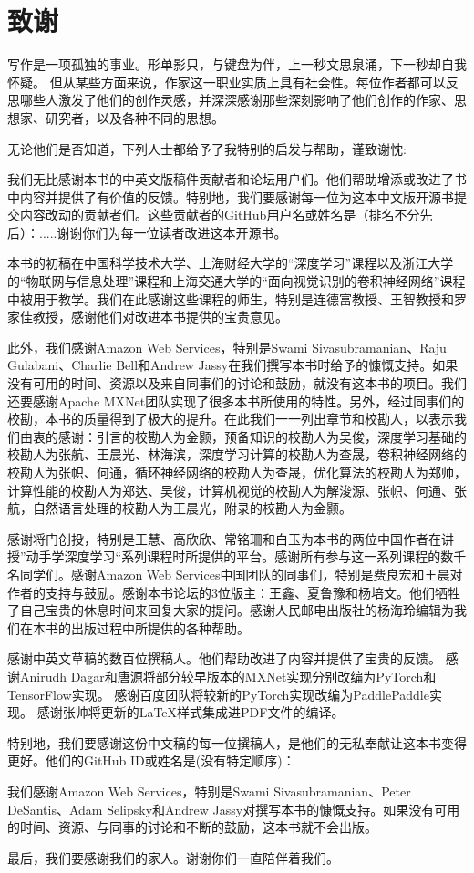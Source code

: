 \chapter*{ 致谢}

写作是一项孤独的事业。形单影只，与键盘为伴，上一秒文思泉涌，下一秒却自我怀疑。
但从某些方面来说，作家这一职业实质上具有社会性。每位作者都可以反思哪些人激发了他们的创作灵感，并深深感谢那些深刻影响了他们创作的作家、思想家、研究者，以及各种不同的思想。

无论他们是否知道，下列人士都给予了我特别的启发与帮助，谨致谢忱:

我们无比感谢本书的中英文版稿件贡献者和论坛用户们。他们帮助增添或改进了书中内容并提供了有价值的反馈。特别地，我们要感谢每一位为这本中文版开源书提交内容改动的贡献者们。这些贡献者的GitHub用户名或姓名是（排名不分先后）：.....谢谢你们为每一位读者改进这本开源书。

本书的初稿在中国科学技术大学、上海财经大学的“深度学习”课程以及浙江大学的“物联网与信息处理”课程和上海交通大学的“面向视觉识别的卷积神经网络”课程中被用于教学。我们在此感谢这些课程的师生，特别是连德富教授、王智教授和罗家佳教授，感谢他们对改进本书提供的宝贵意见。

此外，我们感谢Amazon Web Services，特别是Swami Sivasubramanian、Raju Gulabani、Charlie Bell和Andrew Jassy在我们撰写本书时给予的慷慨支持。如果没有可用的时间、资源以及来自同事们的讨论和鼓励，就没有这本书的项目。我们还要感谢Apache MXNet团队实现了很多本书所使用的特性。另外，经过同事们的校勘，本书的质量得到了极大的提升。在此我们一一列出章节和校勘人，以表示我们由衷的感谢：引言的校勘人为金颢，预备知识的校勘人为吴俊，深度学习基础的校勘人为张航、王晨光、林海滨，深度学习计算的校勘人为查晟，卷积神经网络的校勘人为张帜、何通，循环神经网络的校勘人为查晟，优化算法的校勘人为郑帅，计算性能的校勘人为郑达、吴俊，计算机视觉的校勘人为解浚源、张帜、何通、张航，自然语言处理的校勘人为王晨光，附录的校勘人为金颢。

感谢将门创投，特别是王慧、高欣欣、常铭珊和白玉为本书的两位中国作者在讲授”动手学深度学习“系列课程时所提供的平台。感谢所有参与这一系列课程的数千名同学们。感谢Amazon Web Services中国团队的同事们，特别是费良宏和王晨对作者的支持与鼓励。感谢本书论坛的3位版主：王鑫、夏鲁豫和杨培文。他们牺牲了自己宝贵的休息时间来回复大家的提问。感谢人民邮电出版社的杨海玲编辑为我们在本书的出版过程中所提供的各种帮助。


感谢中英文草稿的数百位撰稿人。他们帮助改进了内容并提供了宝贵的反馈。 感谢Anirudh Dagar和唐源将部分较早版本的MXNet实现分别改编为PyTorch和TensorFlow实现。 感谢百度团队将较新的PyTorch实现改编为PaddlePaddle实现。 感谢张帅将更新的LaTeX样式集成进PDF文件的编译。

特别地，我们要感谢这份中文稿的每一位撰稿人，是他们的无私奉献让这本书变得更好。他们的GitHub ID或姓名是(没有特定顺序)：

我们感谢Amazon Web Services，特别是Swami Sivasubramanian、Peter DeSantis、Adam Selipsky和Andrew Jassy对撰写本书的慷慨支持。如果没有可用的时间、资源、与同事的讨论和不断的鼓励，这本书就不会出版。


最后，我们要感谢我们的家人。谢谢你们一直陪伴着我们。

\newpage